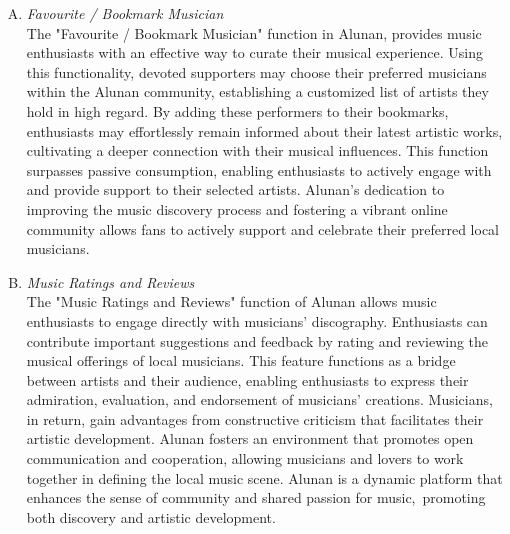 \begin{enumerate}[A.]
    \item \textit{Favourite / Bookmark Musician}\\
    The "Favourite / Bookmark Musician" function in Alunan, provides music enthusiasts with an effective way to curate their musical experience. Using this functionality, devoted supporters may choose their preferred musicians within the Alunan community, establishing a customized list of artists they hold in high regard. By adding these performers to their bookmarks, enthusiasts may effortlessly remain informed about their latest artistic works, cultivating a deeper connection with their musical influences. This function surpasses passive consumption, enabling enthusiasts to actively engage with and provide support to their selected artists. Alunan's dedication to improving the music discovery process and fostering a vibrant online community allows fans to actively support and celebrate their preferred local musicians.
    \item \textit{Music Ratings and Reviews}\\
    The "Music Ratings and Reviews" function of Alunan allows music enthusiasts to engage directly with musicians' discography. Enthusiasts can contribute important suggestions and feedback by rating and reviewing the musical offerings of local musicians. This feature functions as a bridge between artists and their audience, enabling enthusiasts to express their admiration, evaluation, and endorsement of musicians' creations. Musicians, in return, gain advantages from constructive criticism that facilitates their artistic development. Alunan fosters an environment that promotes open communication and cooperation, allowing musicians and lovers to work together in defining the local music scene. Alunan is a dynamic platform that enhances the sense of community and shared passion for music, promoting both discovery and artistic development.
\end{enumerate}

